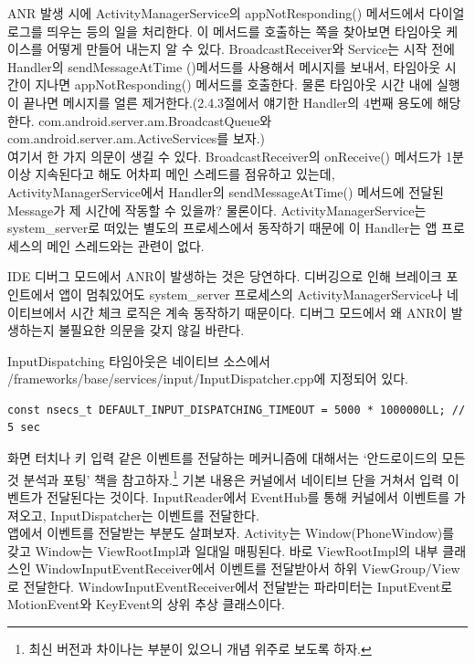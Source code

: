 ANR 발생 시에 ActivityManagerService의 appNotResponding() 메서드에서 다이얼로그를 띄우는 등의 일을 처리한다. 이 메서드를 호출하는 쪽을 찾아보면 타임아웃 케이스를 어떻게 만들어 내는지 알 수 있다.
BroadcastReceiver와 Service는 시작 전에 Handler의 sendMessageAtTime ()메서드를 사용해서 메시지를 보내서, 타임아웃 시간이 지나면 appNotResponding() 메서드를 호출한다. 물론 타임아웃 시간 내에 실행이 끝나면 메시지를 얼른 제거한다.(2.4.3절에서 얘기한 Handler의 4번째 용도에 해당한다. com.android.server.am.BroadcastQueue와 com.android.server.am.ActiveServices를 보자.)\\

여기서 한 가지 의문이 생길 수 있다. BroadcastReceiver의 onReceive() 메서드가 1분 이상 지속된다고 해도 어차피 메인 스레드를 점유하고 있는데, ActivityManagerService에서 Handler의 sendMessageAtTime() 메서드에 전달된 Message가 제 시간에 작동할 수 있을까? 
물론이다. ActivityManagerService는 system\_server로 떠있는 별도의 프로세스에서 동작하기 때문에 이 Handler는 앱 프로세스의 메인 스레드와는 관련이 없다.\\

\colorbox{tearose}{\parbox[t]{15cm}{
IDE 디버그 모드에서 ANR이 발생하는 것은 당연하다. 디버깅으로 인해 브레이크 포인트에서 앱이 멈춰있어도 system\_server 프로세스의 ActivityManagerService나 네이티브에서 시간 체크 로직은 계속 동작하기 때문이다. 디버그 모드에서 왜 ANR이 발생하는지 불필요한 의문을 갖지 않길 바란다.
}}\newline\newline

InputDispatching 타임아웃은 네이티브 소스에서 /frameworks/base/services/input/InputDispatcher.cpp에 지정되어 있다.
\begin{lstlisting}[frame=single] 
	const nsecs_t DEFAULT_INPUT_DISPATCHING_TIMEOUT = 5000 * 1000000LL; // 5 sec
\end{lstlisting}
화면 터치나 키 입력 같은 이벤트를 전달하는 메커니즘에 대해서는 `안드로이드의 모든 것 분석과 포팅' 책을 참고하자.\footnote{최신 버전과 차이나는 부분이 있으니 개념 위주로 보도록 하자.} 기본 내용은 커널에서 네이티브 단을 거쳐서 입력 이벤트가 전달된다는 것이다. InputReader에서 EventHub를 통해 커널에서 이벤트를 가져오고, InputDispatcher는 이벤트를 전달한다.\\

앱에서 이벤트를 전달받는 부분도 살펴보자. Activity는 Window(PhoneWindow)를 갖고 Window는 ViewRootImpl과 일대일 매핑된다. 바로 ViewRootImpl의 내부 클래스인 WindowInputEventReceiver에서 이벤트를 전달받아서 하위 ViewGroup/View로 전달한다. WindowInputEventReceiver에서 전달받는 파라미터는 InputEvent로 MotionEvent와 KeyEvent의 상위 추상 클래스이다.\\

